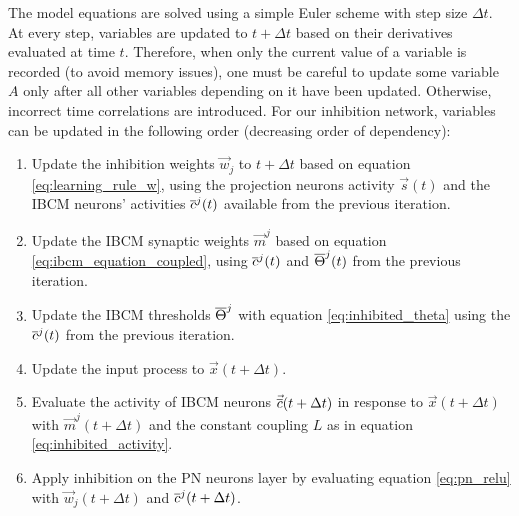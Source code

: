 The model equations are solved using a simple Euler scheme with step size $\Delta t$. At every step, variables are updated to $t+\Delta t$ based on their derivatives evaluated at time $t$. Therefore, when only the current value of a variable is recorded (to avoid memory issues), one must be careful to update some variable $A$ only after all other variables depending on it have been updated. Otherwise, incorrect time correlations are introduced. For our inhibition network, variables can be updated in the following order (decreasing order of dependency):
\begin{enumerate}
	\item Update the inhibition weights $\vec{w}_j$ to $t+\Delta t$ based on equation \eqref{eq:learning_rule_w}, using the projection neurons activity $\vec{s}(t)$ and the IBCM neurons' activities $\overline{c}^j(t)$ available from the previous iteration. 
	\item Update the IBCM synaptic weights $\vec{m}^j$ based on equation \eqref{eq:ibcm_equation_coupled}, using $\overline{c}^j(t)$ and $\overline{\Theta}^j(t)$ from the previous iteration.
	\item Update the IBCM thresholds $\overline{\Theta}^j$ with equation \eqref{eq:inhibited_theta} using the $\overline{c}^j(t)$ from the previous iteration. 
	\item Update the input process to $\vec{x}(t + \Delta t)$. 
	\item Evaluate the activity of IBCM neurons $\vec{\overline{c}}(t + \Delta t)$ in response to $\vec{x}(t+\Delta t)$ with $\vec{m}^j(t+\Delta t)$ and the constant coupling $L$ as in equation \eqref{eq:inhibited_activity}.  	
	\item Apply inhibition on the PN neurons layer by evaluating equation \eqref{eq:pn_relu} with $\vec{w}_j(t+\Delta t)$ and $\overline{c}^j(t+\Delta t)$. 
\end{enumerate}



